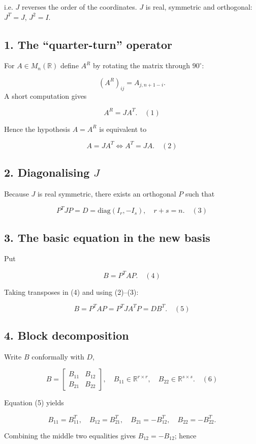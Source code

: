 \documentclass[12pt,a4paper]{article}
\theoremstyle{definition}
\begin{document}
i.e. $J$ reverses the order of the coordinates.
$J$ is real, symmetric and orthogonal: $J^T = J$, $J^2 = I$.

\subsection*{1. The ``quarter-turn'' operator}
For $A\in M_n(\mathbb{R})$ define $A^R$ by rotating the matrix through $90^\circ$:

$$(A^R)_{ij}=A_{j,n+1-i}.$$
A short computation gives

$$A^R = J A^T.\quad(1)$$

Hence the hypothesis $A = A^R$ is equivalent to

$$A = J A^T \Leftrightarrow A^T = J A.\quad(2)$$

\subsection*{2. Diagonalising $J$}
Because $J$ is real symmetric, there exists an orthogonal $P$ such that

$$P^T J P = D = \text{diag}(I_r , -I_s),\quad r+s = n.\quad(3)$$

\subsection*{3. The basic equation in the new basis}
Put

$$B = P^T A P.\quad(4)$$

Taking transposes in (4) and using (2)–(3):

$$B = P^T A P = P^T J A^T P = D B^T.\quad(5)$$

\subsection*{4. Block decomposition}
Write $B$ conformally with $D$,

$$B = \begin{bmatrix} B_{11} & B_{12} \\ B_{21} & B_{22} \end{bmatrix},\quad B_{11}\in\mathbb{R}^{r\times r},\quad B_{22}\in\mathbb{R}^{s\times s}.\quad(6)$$

Equation (5) yields

$$B_{11}=B_{11}^T,\quad B_{12}=B_{21}^T,\quad B_{21}=-B_{12}^T,\quad B_{22}=-B_{22}^T.$$

Combining the middle two equalities gives $B_{12} = -B_{12}$; hence
\end{document}
